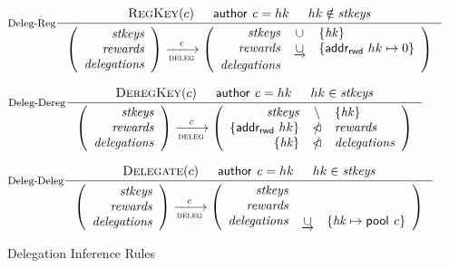\documentclass[11pt,a4paper]{article}
\newcommand{\restrictdom}{\lhd}
\newcommand{\subtractdom}{\mathbin{\slashed{\restrictdom}}}
\newcommand{\union}{\cup}
\newcommand{\unionoverride}{\mathbin{\underrightarrow\cup}}
\newcommand{\var}[1]{\mathit{#1}}
\newcommand{\fun}[1]{\mathsf{#1}}
\newcommand{\trans}[2]{\xlongrightarrow[\textsc{#1}]{#2}}
\newcommand{\RegKey}[1]{\textsc{RegKey}(#1)}
\newcommand{\DeregKey}[1]{\textsc{DeregKey}(#1)}
\newcommand{\Delegate}[1]{\textsc{Delegate}(#1)}
\newcommand{\cauthor}[1]{\fun{author}~ \var{#1}}
\newcommand{\pool}[1]{\fun{pool}~ \var{#1}}
\newcommand{\addr}[1]{\fun{addr_{rwd}}~ \var{#1}}
\begin{document}
\begin{figure}
  \centering
  \begin{equation}\label{eq:deleg-reg}
    \inference[Deleg-Reg]
    {
      \RegKey{c} & \cauthor{c} = hk & hk \notin \var{stkeys}
    }
    {
      \left(
      \begin{array}{r}
        \var{stkeys} \\
        \var{rewards} \\
        \var{delegations}
      \end{array}
      \right)
      \trans{deleg}{\var{c}}
      \left(
      \begin{array}{rcl}
        \var{stkeys} & \union & \{\var{hk}\}\\
        \var{rewards} & \unionoverride & \{\addr \var{hk} \mapsto 0\}\\
        \var{delegations}
      \end{array}
      \right)
    }
  \end{equation}

  \begin{equation}\label{eq:deleg-dereg}
    \inference[Deleg-Dereg]
    {
      \DeregKey{c} & \cauthor{c} = hk & hk \in \var{stkeys}
    }
    {
      \left(
      \begin{array}{r}
        \var{stkeys} \\
        \var{rewards} \\
        \var{delegations}
      \end{array}
      \right)
      \trans{deleg}{\var{c}}
      \left(
      \begin{array}{rcl}
        \var{stkeys} & \setminus & \{\var{hk}\}\\
        \{\addr \var{hk}\} & \subtractdom & \var{rewards} \\
        \{\var{hk}\} & \subtractdom & \var{delegations}
      \end{array}
      \right)
    }
  \end{equation}

  \begin{equation}\label{eq:deleg-deleg}
    \inference[Deleg-Deleg]
    {
      \Delegate{c} & \cauthor{c} = hk & hk \in \var{stkeys}
    }
    {
      \left(
      \begin{array}{r}
        \var{stkeys} \\
        \var{rewards} \\
        \var{delegations}
      \end{array}
      \right)
      \trans{deleg}{c}
      \left(
      \begin{array}{rcl}
        \var{stkeys} \\
        \var{rewards} \\
        \var{delegations} & \unionoverride & \{\var{hk} \mapsto \pool c\}
      \end{array}
      \right)
    }
  \end{equation}
  \caption{Delegation Inference Rules}
  \label{fig:delegation-rules}
\end{figure}
\end{document}
